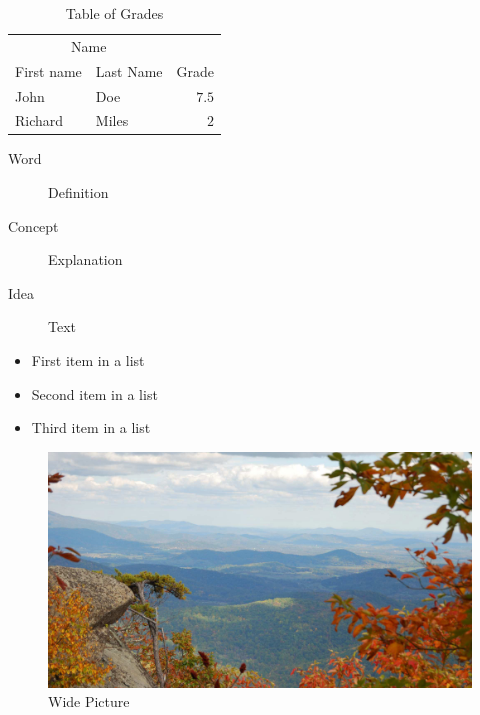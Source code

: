 \lipsum[11]

\begin{table}[hbt]
\caption{Table of Grades}
\centering
\begin{tabular}{llr}
\toprule
\multicolumn{2}{c}{Name} \\
\cmidrule(r){1-2}
First name & Last Name & Grade \\
\midrule
John & Doe & $7.5$ \\
Richard & Miles & $2$ \\
\bottomrule
\end{tabular}
\label{tab:label}
\end{table}

\begin{description}
\item[Word] Definition
\item[Concept] Explanation
\item[Idea] Text
\end{description}

\begin{itemize}[noitemsep] 
\item First item in a list
\item Second item in a list
\item Third item in a list
\end{itemize}

\begin{figure}[ht]\centering 
\includegraphics[width=\linewidth]{figures/view.jpg}
\caption{Wide Picture}
\label{fig:view}
\end{figure}

